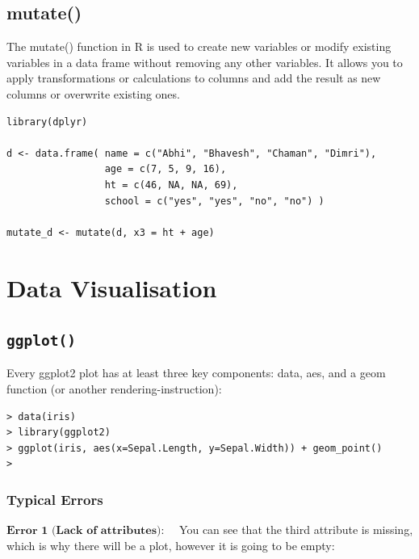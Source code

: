 \documentclass[10pt,a4paper]{article}
\begin{document}
\subsection{mutate()}

The mutate() function in R is used to create new variables or modify existing variables in a data frame without removing any other variables. It allows you to apply transformations or calculations to columns and add the result as new columns or overwrite existing ones.

\vspace{0.5em}

\begin{lstlisting}
library(dplyr) 

d <- data.frame( name = c("Abhi", "Bhavesh", "Chaman", "Dimri"), 
                 age = c(7, 5, 9, 16), 
                 ht = c(46, NA, NA, 69), 
                 school = c("yes", "yes", "no", "no") ) 

mutate_d <- mutate(d, x3 = ht + age) 

\end{lstlisting}

\vspace{1em}

\section{Data Visualisation}

\subsection*{\texttt{ggplot()}}

Every ggplot2 plot has at least three key components: data, aes, and a geom function (or another rendering-instruction):

\vspace{0.5em}

\begin{lstlisting}
> data(iris)
> library(ggplot2)
> ggplot(iris, aes(x=Sepal.Length, y=Sepal.Width)) + geom_point()
>
\end{lstlisting}

\vspace{1em}

\subsubsection{Typical Errors}

$\textbf{Error 1 (Lack of attributes):} \quad$ You can see that the third attribute is missing, which is why there will be a plot, however it is going to be empty:
\end{document}
